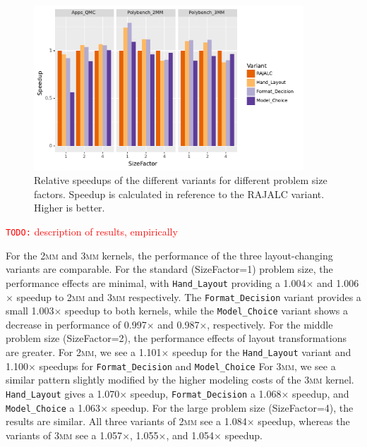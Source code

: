 \documentclass[sigconf,review=true]{acmart}
\newcommand{\todo}[1]{{\textcolor{red}{{\tt{TODO:}}\,\,#1 }}}
\begin{document}
\begin{figure}
	\includegraphics[width=0.9\textwidth]{speedups.pdf}
	\caption{Relative speedups of the different variants for different problem size factors. Speedup is calculated in reference to the RAJALC variant. Higher is better.}
	\label{fig:speedups}
\end{figure}

\todo{description of results, empirically}

For the \textsc{2mm} and \textsc{3mm} kernels, the performance of the three layout-changing variants are comparable. 
For the standard (SizeFactor=1) problem size, the performance effects are minimal, with \verb.Hand_Layout. providing a 1.004$\times$ and 1.006$\times$ speedup to \textsc{2mm} and \textsc{3mm} respectively. 
The \verb.Format_Decision. variant provides a small 1.003$\times$ speedup to both kernels, while the \verb.Model_Choice. variant shows a decrease in performance of 0.997$\times$ and 0.987$\times$, respectively. 
For the middle problem size (SizeFactor=2), the performance effects of layout transformations are greater. 
For \textsc{2mm}, we see a 1.101$\times$ speedup for the \verb.Hand_Layout. variant and 1.100$\times$ speedups for \verb.Format_Decision. and \verb.Model_Choice. 
For \textsc{3mm}, we see a similar pattern slightly modified by the higher modeling costs of the \textsc{3mm} kernel. \verb.Hand_Layout. gives a 1.070$\times$ speedup, \verb.Format_Decision. a 1.068$\times$ speedup, and \verb.Model_Choice. a 1.063$\times$ speedup.
For the large problem size (SizeFactor=4), the results are similar.
All three variants of \textsc{2mm} see a 1.084$\times$ speedup, whereas the variants of \textsc{3mm} see a 1.057$\times$, 1.055$\times$, and 1.054$\times$ speedup.
\end{document}
